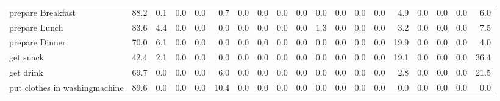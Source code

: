\documentclass{article}
\begin{document}
\begin{sideways}
\begin{tabular}{lrrrrrrrrrrrrrrrrrr}
prepare Breakfast             &        88.2 &                0.1 &           0.0 &                          0.0 &                0.7 &                0.0 &                        0.0 &          0.0 &              0.0 &                0.0 &                    0.0 &                      0.0 &                  0.0 &                   4.9 &              0.0 &              0.0 &                                  0.0 &          6.0 \\
prepare Lunch                 &        83.6 &                4.4 &           0.0 &                          0.0 &                0.0 &                0.0 &                        0.0 &          0.0 &              0.0 &                1.3 &                    0.0 &                      0.0 &                  0.0 &                   3.2 &              0.0 &              0.0 &                                  0.0 &          7.5 \\
prepare Dinner                &        70.0 &                6.1 &           0.0 &                          0.0 &                0.0 &                0.0 &                        0.0 &          0.0 &              0.0 &                0.0 &                    0.0 &                      0.0 &                  0.0 &                  19.9 &              0.0 &              0.0 &                                  0.0 &          4.0 \\
get snack                     &        42.4 &                2.1 &           0.0 &                          0.0 &                0.0 &                0.0 &                        0.0 &          0.0 &              0.0 &                0.0 &                    0.0 &                      0.0 &                  0.0 &                  19.1 &              0.0 &              0.0 &                                  0.0 &         36.4 \\
get drink                     &        69.7 &                0.0 &           0.0 &                          0.0 &                6.0 &                0.0 &                        0.0 &          0.0 &              0.0 &                0.0 &                    0.0 &                      0.0 &                  0.0 &                   2.8 &              0.0 &              0.0 &                                  0.0 &         21.5 \\
put clothes in washingmachine &        89.6 &                0.0 &           0.0 &                          0.0 &               10.4 &                0.0 &                        0.0 &          0.0 &              0.0 &                0.0 &                    0.0 &                      0.0 &                  0.0 &                   0.0 &              0.0 &              0.0 &                                  0.0 &          0.0 \\

\end{tabular}
\end{sideways}
\end{document}
